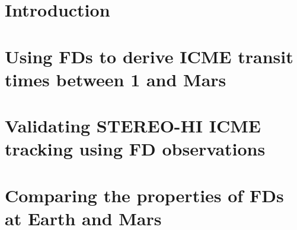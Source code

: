 \documentclass[ twoside,openright,titlepage,numbers=noenddot,headinclude,%
footinclude=true,cleardoublepage=empty,abstractoff, %
BCOR=10mm,paper=a4,fontsize=11pt,%
ngerman,american]{scrreprt} %
\begin{document}
\frenchspacing
\raggedbottom
{} %
\pagestyle{plain}



\cleardoublepage

\cleardoublepage

%



\cleardoublepage
{}
\setcounter{page}{1}	
	
\chapter{Introduction}

\chapter{Using FDs to derive ICME transit times between \SI{1}{\AU} and Mars}



\chapter{Validating STEREO-HI ICME tracking using FD observations}



\chapter{Comparing the properties of FDs at Earth and Mars}



\newpage
\markboth{}{\thepage}
\cleardoublepage
{}
{}

\printbibliography

\cleardoublepage


\cleardoublepage

\end{document}
